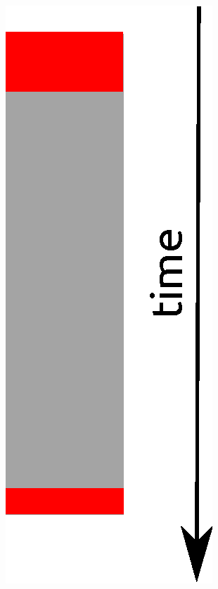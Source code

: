 \documentclass[aspectratio=169]{beamer}
\begin{document}
\begin{frame}[fragile]
\begin{columns}
    \begin{column}{.18\textwidth}
      \includegraphics[scale=0.6]{img/part1_1_single.eps}
    \end{column}
  \end{columns}
\end{frame}
\end{document}
